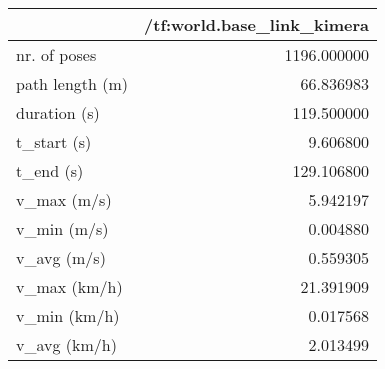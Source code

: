 \begin{tabular}{lr}
\toprule
{} &  /tf:world.base\_link\_kimera \\
\midrule
nr. of poses    &                 1196.000000 \\
path length (m) &                   66.836983 \\
duration (s)    &                  119.500000 \\
t\_start (s)     &                    9.606800 \\
t\_end (s)       &                  129.106800 \\
v\_max (m/s)     &                    5.942197 \\
v\_min (m/s)     &                    0.004880 \\
v\_avg (m/s)     &                    0.559305 \\
v\_max (km/h)    &                   21.391909 \\
v\_min (km/h)    &                    0.017568 \\
v\_avg (km/h)    &                    2.013499 \\
\bottomrule
\end{tabular}
